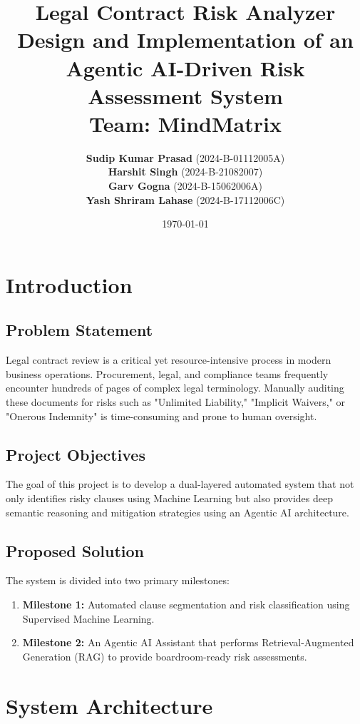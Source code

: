 \documentclass[12pt, a4paper]{report}
\title{
    \textbf{Legal Contract Risk Analyzer}\\
    \large Design and Implementation of an Agentic AI-Driven Risk Assessment System\\
    \vspace{1cm}
    \small Team: \textbf{MindMatrix}
}
\author{
    \textbf{Sudip Kumar Prasad} (2024-B-01112005A) \\
    \textbf{Harshit Singh} (2024-B-21082007) \\
    \textbf{Garv Gogna} (2024-B-15062006A) \\
    \textbf{Yash Shriram Lahase} (2024-B-17112006C)
}
\date{\today}
\begin{document}
\maketitle

\tableofcontents
\newpage

\chapter{Introduction}
\section{Problem Statement}
Legal contract review is a critical yet resource-intensive process in modern business operations. Procurement, legal, and compliance teams frequently encounter hundreds of pages of complex legal terminology. Manually auditing these documents for risks such as "Unlimited Liability," "Implicit Waivers," or "Onerous Indemnity" is time-consuming and prone to human oversight. 

\section{Project Objectives}
The goal of this project is to develop a dual-layered automated system that not only identifies risky clauses using Machine Learning but also provides deep semantic reasoning and mitigation strategies using an Agentic AI architecture.

\section{Proposed Solution}
The system is divided into two primary milestones:
\begin{enumerate}
    \item \textbf{Milestone 1:} Automated clause segmentation and risk classification using Supervised Machine Learning.
    \item \textbf{Milestone 2:} An Agentic AI Assistant that performs Retrieval-Augmented Generation (RAG) to provide boardroom-ready risk assessments.
\end{enumerate}

\chapter{System Architecture}
\end{document}
